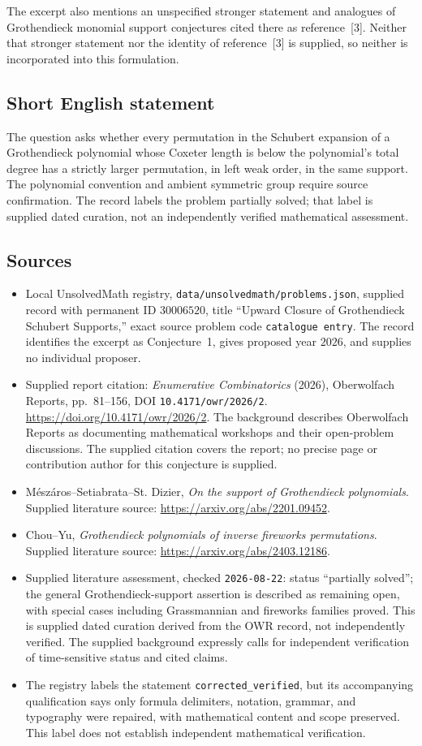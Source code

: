 \documentclass[11pt]{article}
\begin{document}
The excerpt also mentions an unspecified stronger statement and analogues of Grothendieck monomial support conjectures cited there as reference~[3]. Neither that stronger statement nor the identity of reference~[3] is supplied, so neither is incorporated into this formulation.
\subsection{Short English statement}
The question asks whether every permutation in the Schubert expansion of a Grothendieck polynomial whose Coxeter length is below the polynomial's total degree has a strictly larger permutation, in left weak order, in the same support. The polynomial convention and ambient symmetric group require source confirmation. The record labels the problem partially solved; that label is supplied dated curation, not an independently verified mathematical assessment.
\subsection{Sources}
\begin{itemize}
\item Local UnsolvedMath registry, \texttt{data/unsolvedmath/problems.json}, supplied record with permanent ID \(30006520\), title ``Upward Closure of Grothendieck Schubert Supports,'' exact source problem code \texttt{catalogue entry}. The record identifies the excerpt as Conjecture~1, gives proposed year \(2026\), and supplies no individual proposer.
\item Supplied report citation: \emph{Enumerative Combinatorics} (2026), Oberwolfach Reports, pp.~81--156, DOI \texttt{10.4171/owr/2026/2}. \url{https://doi.org/10.4171/owr/2026/2}. The background describes Oberwolfach Reports as documenting mathematical workshops and their open-problem discussions. The supplied citation covers the report; no precise page or contribution author for this conjecture is supplied.
\item Mészáros--Setiabrata--St. Dizier, \emph{On the support of Grothendieck polynomials}. Supplied literature source: \url{https://arxiv.org/abs/2201.09452}.
\item Chou--Yu, \emph{Grothendieck polynomials of inverse fireworks permutations}. Supplied literature source: \url{https://arxiv.org/abs/2403.12186}.
\item Supplied literature assessment, checked \texttt{2026-08-22}: status ``partially solved''; the general Grothendieck-support assertion is described as remaining open, with special cases including Grassmannian and fireworks families proved. This is supplied dated curation derived from the OWR record, not independently verified. The supplied background expressly calls for independent verification of time-sensitive status and cited claims.
\item The registry labels the statement \texttt{corrected\_verified}, but its accompanying qualification says only formula delimiters, notation, grammar, and typography were repaired, with mathematical content and scope preserved. This label does not establish independent mathematical verification.
\end{itemize}
\end{document}
